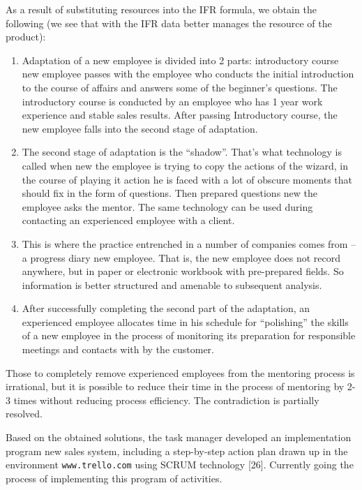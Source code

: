\documentclass[11pt,a4paper]{book}
\begin{document}
As a result of substituting resources into the IFR formula, we obtain the
following (we see that with the IFR data better manages the resource of the
product):
\begin{enumerate}
\item Adaptation of a new employee is divided into 2 parts: introductory
  course new employee passes with the employee who conducts the initial
  introduction to the course of affairs and answers some of the beginner's
  questions. The introductory course is conducted by an employee who has 1
  year work experience and stable sales results. After passing Introductory
  course, the new employee falls into the second stage of adaptation.
\item The second stage of adaptation is the “shadow”. That's what technology
  is called when new the employee is trying to copy the actions of the wizard,
  in the course of playing it action he is faced with a lot of obscure moments
  that should fix in the form of questions. Then prepared questions new the
  employee asks the mentor. The same technology can be used during contacting
  an experienced employee with a client.
\item This is where the practice entrenched in a number of companies comes
  from -- a progress diary new employee. That is, the new employee does not
  record anywhere, but in paper or electronic workbook with pre-prepared
  fields. So information is better structured and amenable to subsequent
  analysis.
\item After successfully completing the second part of the adaptation, an
  experienced employee allocates time in his schedule for “polishing” the
  skills of a new employee in the process of monitoring its preparation for
  responsible meetings and contacts with by the customer.
\end{enumerate}
Those to completely remove experienced employees from the mentoring process is
irrational, but it is possible to reduce their time in the process of
mentoring by 2-3 times without reducing process efficiency. The contradiction
is partially resolved.

Based on the obtained solutions, the task manager developed an implementation
program new sales system, including a step-by-step action plan drawn up in the
environment \texttt{www.trello.com} using SCRUM technology [26]. Currently
going the process of implementing this program of activities.

\chapter{}%
\end{document}
